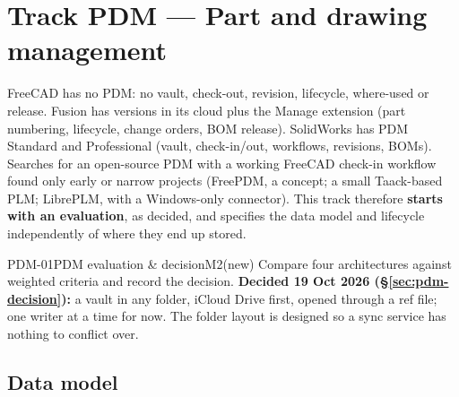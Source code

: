 \section{Track PDM --- Part and drawing management}\label{sec:pdm}

FreeCAD has no PDM: no vault, check-out, revision, lifecycle, where-used or release. Fusion has
versions in its cloud plus the Manage extension (part numbering, lifecycle, change orders, BOM release).
SolidWorks has PDM Standard and Professional (vault, check-in/out, workflows, revisions, BOMs). Searches
for an open-source PDM with a working FreeCAD check-in workflow found only early or narrow projects
(FreePDM, a concept; a small Taack-based PLM; LibrePLM, with a Windows-only connector). This track
therefore \textbf{starts with an evaluation}, as decided, and specifies the data model and lifecycle
independently of where they end up stored.

\begin{epic}{PDM-01}{PDM evaluation \& decision}{M2}{\stDone}{(new)}
Compare four architectures against weighted criteria and record the decision. \textbf{Decided 19 Oct 2026
(\S\ref{sec:pdm-decision}):} a vault in any folder, iCloud Drive first, opened through a  ref file;
one writer at a time for now. The folder layout is designed so a sync service has nothing to conflict over.
\end{epic}



















\subsection{Data model}

